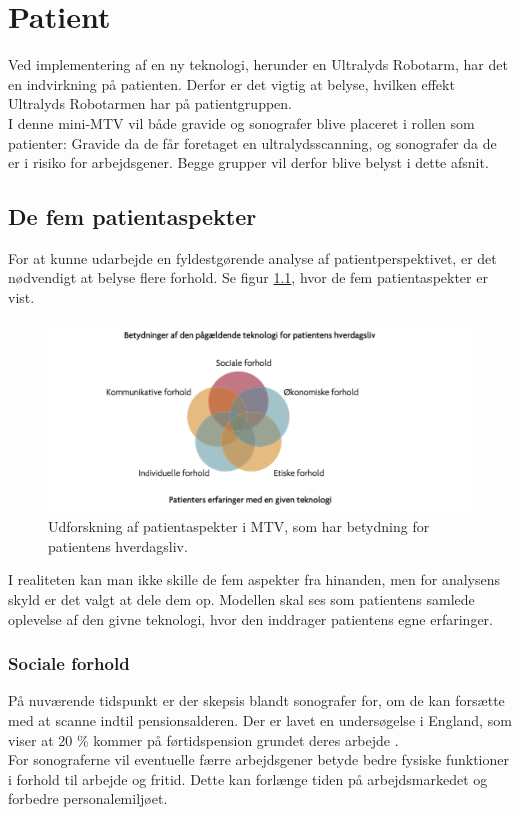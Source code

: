 \chapter{Patient}
Ved implementering af en ny teknologi, herunder en Ultralyds Robotarm, har det en indvirkning på patienten. Derfor er det vigtig at belyse, hvilken effekt Ultralyds Robotarmen har på patientgruppen. \\
I denne mini-MTV vil både gravide og sonografer blive placeret i rollen som patienter: Gravide da de får foretaget en ultralydsscanning, og sonografer da de er i risiko for arbejdsgener. Begge grupper vil derfor blive belyst i dette afsnit.  

\section{De fem patientaspekter}
For at kunne udarbejde en fyldestgørende analyse af patientperspektivet, er det nødvendigt at belyse flere forhold. Se figur \ref{patientMTV}, hvor de fem patientaspekter er vist. 
\begin{figure}[h!]\centering
	\includegraphics[width = 1.0\textwidth]{Figurer/PatientaspekterMTV}
	\caption{Udforskning af patientaspekter i MTV, som har betydning for patientens hverdagsliv. \cite{Leavitt}}
	\label{patientMTV}
\end{figure}

I realiteten kan man ikke skille de fem aspekter fra hinanden, men for analysens skyld er det valgt at dele dem op. Modellen skal ses som patientens samlede oplevelse af den givne teknologi, hvor den inddrager patientens egne erfaringer. 

\subsection{Sociale forhold}
På nuværende tidspunkt er der skepsis blandt sonografer for, om de kan forsætte med at scanne indtil pensionsalderen. Der er lavet en undersøgelse i England, som viser at 20 \% kommer på førtidspension grundet deres arbejde \cite{32}.  \\ 
For sonograferne vil eventuelle færre arbejdsgener betyde bedre fysiske funktioner i forhold til arbejde og fritid. Dette kan forlænge tiden på arbejdsmarkedet og forbedre personalemiljøet.      

